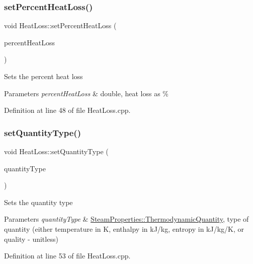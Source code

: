 \subsubsection{\texorpdfstring{set\+Percent\+Heat\+Loss()}{setPercentHeatLoss()}}
{\footnotesize\ttfamily void Heat\+Loss\+::set\+Percent\+Heat\+Loss (\begin{DoxyParamCaption}\item[{double}]{percent\+Heat\+Loss }\end{DoxyParamCaption})}

Sets the percent heat loss 
\begin{DoxyParams}{Parameters}
{\em percent\+Heat\+Loss} & double, heat loss as \% \\
\hline
\end{DoxyParams}


Definition at line 48 of file Heat\+Loss.\+cpp.

\mbox{\label{class_heat_loss_a7c125f1137f31eba8826a1aa3b905290}} 
\subsubsection{\texorpdfstring{set\+Quantity\+Type()}{setQuantityType()}}
{\footnotesize\ttfamily void Heat\+Loss\+::set\+Quantity\+Type (\begin{DoxyParamCaption}\item[{\hyperlink{class_steam_properties_ae0294bedf7d178c2d8fb6aed0f62fbff}{Steam\+Properties\+::\+Thermodynamic\+Quantity}}]{quantity\+Type }\end{DoxyParamCaption})}

Sets the quantity type 
\begin{DoxyParams}{Parameters}
{\em quantity\+Type} & \hyperlink{class_steam_properties_ae0294bedf7d178c2d8fb6aed0f62fbff}{Steam\+Properties\+::\+Thermodynamic\+Quantity}, type of quantity (either temperature in K, enthalpy in k\+J/kg, entropy in k\+J/kg/K, or quality -\/ unitless) \\
\hline
\end{DoxyParams}


Definition at line 53 of file Heat\+Loss.\+cpp.

\mbox{\label{class_heat_loss_ae6b6c4ac28471d7bc94e3886c48a90bd}} 
